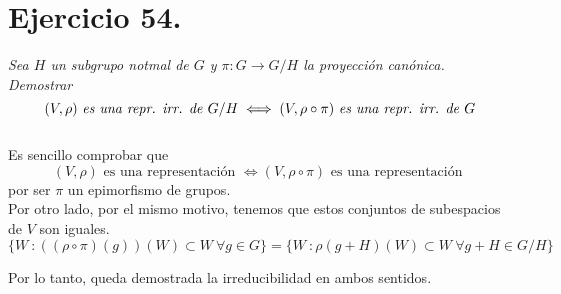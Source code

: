 \section{Ejercicio 54. }\emph{ Sea \(H\) un subgrupo notmal de \(G\) y \(\pi:G \to G/H\) la proyección canónica. Demostrar }
\[
  (V,\rho) \text{ \emph{es una repr. irr. de} } G/H \iff (V,\rho \circ \pi) \text{ \emph{es una repr. irr. de} } G
\]\\

Es sencillo comprobar que
\[
  (V,\rho) \text{ es una representación } \iff (V, \rho \circ \pi ) \text{ es una representación }
\]
por ser \(\pi\) un epimorfismo de grupos.\\

Por otro lado, por el mismo motivo, tenemos que estos conjuntos de subespacios de \(V\) son iguales.
\[
   \{ W \ :  ((\rho \circ \pi)(g))(W) \subset W \ \forall g \in G\} = \{ W \ : \rho(g+H)(W) \subset W \ \forall g+H \in G/H\}
\]

Por lo tanto, queda demostrada la irreducibilidad en ambos sentidos.
